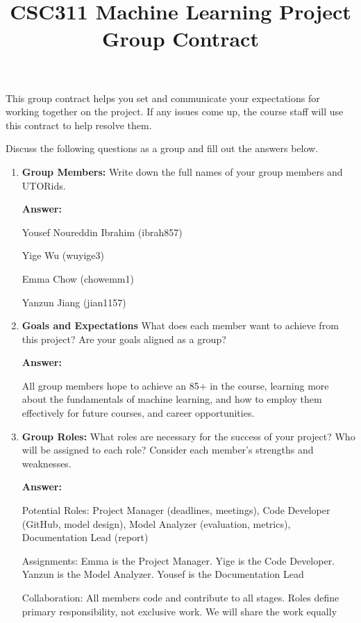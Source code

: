 \documentclass[12pt]{article}
\title{CSC311 Machine Learning Project Group Contract}
\author{}
\date{}
\newenvironment{answer}[1][]{
  \color{blue}\textbf{Answer:}
}{}
\begin{document}
\maketitle

This group contract helps you set and communicate your expectations for working together on the project. If any issues come up, the course staff will use this contract to help resolve them.

Discuss the following questions as a group and fill out the answers below.

\begin{enumerate}
\item {\bf Group Members:} Write down the full names of your group members and UTORids.

\begin{answer}

Yousef Noureddin Ibrahim (ibrah857)

Yige Wu (wuyige3)

Emma Chow (chowemm1)

Yanzun Jiang (jian1157)
\end{answer}

\item {\bf Goals and Expectations} What does each member want to achieve from this project? Are your goals aligned as a group?

\begin{answer}

All group members hope to achieve an 85+ in the course, learning more about the fundamentals of machine learning, and how to employ them effectively for future courses, and career opportunities.
\end{answer}

\item {\bf Group Roles:} What roles are necessary for the success of your project? Who will be assigned to each role? Consider each member's strengths and weaknesses.

\begin{answer}

Potential Roles: Project Manager (deadlines, meetings), Code Developer (GitHub, model design), Model Analyzer (evaluation, metrics), Documentation Lead (report)

Assignments: Emma is the Project Manager. Yige is the Code Developer. Yanzun is the Model Analyzer. Yousef is the Documentation Lead

Collaboration: All members code and contribute to all stages. Roles define primary responsibility, not exclusive work. We will share the work equally
\end{answer}


\end{enumerate}
\end{document}
